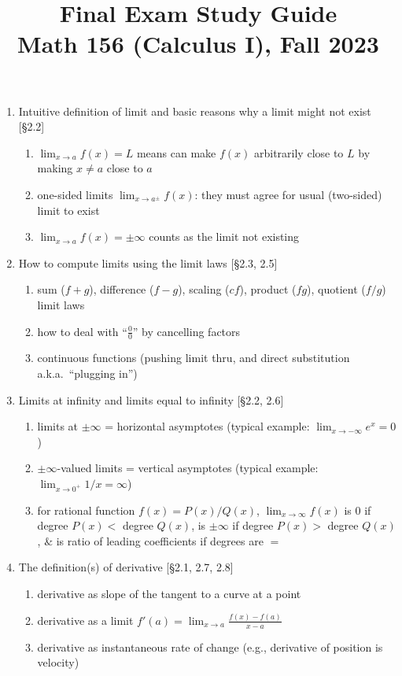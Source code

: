 \documentclass[11pt]{article}
\title{Final Exam Study Guide \\ Math 156 (Calculus I), Fall 2023}
\date{}
\begin{document}
\maketitle

\pagestyle{empty}
\thispagestyle{empty}

\vspace{-2.5cm}

\begin{enumerate}
\item Intuitive definition of limit and basic reasons why a limit might not exist [\S2.2]
\begin{enumerate}
\item $\lim_{x\to a} f(x) = L$ means can make $f(x)$ arbitrarily close to $L$ by making $x \neq a$ close to $a$
\item one-sided limits $\lim_{x\to a^{\pm}} f(x)$: they must agree for usual (two-sided) limit to exist
\item $\lim_{x\to a} f(x) = \pm \infty$ counts as the limit not existing
\end{enumerate}

\item How to compute limits using the limit laws [\S2.3, 2.5]
\begin{enumerate}
\item sum ($f+g$), difference ($f-g$), scaling ($cf$), product ($fg$), quotient ($f/g$) limit laws
\item how to deal with ``$\frac{0}{0}$'' by cancelling factors
\item continuous functions (pushing limit thru, and direct substitution a.k.a.~``plugging in'')
\end{enumerate}

\item Limits at infinity and limits equal to infinity [\S2.2, 2.6]
\begin{enumerate}
\item limits at $\pm \infty$ = horizontal asymptotes (typical example: $\lim_{x\to -\infty} e^x = 0$)
\item $\pm \infty$-valued limits = vertical asymptotes (typical example: $\lim_{x\to 0^+} 1/x=\infty$)
\item for rational function $f(x) = P(x)/Q(x)$, $\lim_{x\to \infty} f(x)$ is $0$ if degree $P(x) <$ degree $Q(x)$, is $\pm\infty$ if degree $P(x) >$ degree $Q(x)$, $\&$ is ratio of leading coefficients if degrees are $=$
\end{enumerate}

\item The definition(s) of derivative [\S2.1, 2.7, 2.8]
\begin{enumerate}
\item derivative as slope of the tangent to a curve at a point
\item derivative as a limit $f'(a) = \lim_{x \to a} \frac{f(x)-f(a)}{x-a}$
\item derivative as instantaneous rate of change (e.g., derivative of position is velocity)
\end{enumerate}


\end{enumerate}
\end{document}

